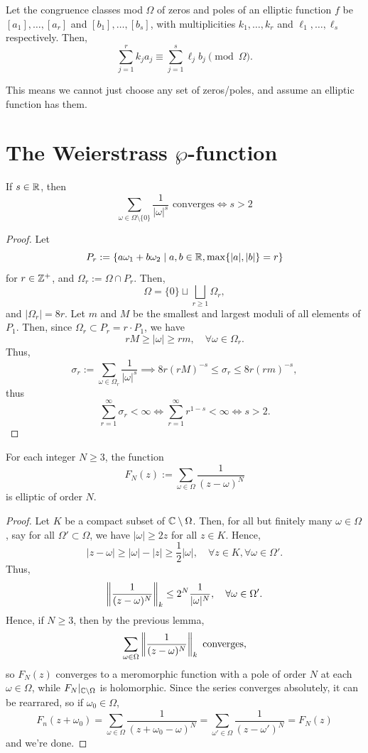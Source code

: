 \documentclass[11pt]{article}
\begin{document}
\begin{thm}
    Let the congruence classes mod $\Omega$ of zeros and poles of an elliptic function $f$ be $[a_1],\dots,[a_r]$ and $[b_1],\dots,[b_s]$, with multiplicities $k_1,\dots,k_r$ and $\ell_1,\dots,\ell_s$ respectively. Then,
    $$\sum_{j=1}^rk_ja_j \equiv \sum_{j=1}^s \ell_jb_j \pmod \Omega.$$
\end{thm}
This means we cannot just choose any set of zeros/poles, and assume an elliptic function has them.

\section{\texorpdfstring{The Weierstrass $\wp$-function}{The Weierstrass p-function}}

\begin{lem}
    If $s \in \mathbb{R}$, then
    $$\sum_{\omega \in \Omega\setminus\{0\}}\frac{1}{|\omega|^s} \text{ converges} \iff s>2$$
\end{lem}

\begin{proof}
    Let 
    $$P_r:=\{a\omega_1+b\omega_2 \mid a,b\in \mathbb{R}, \max \{|a|,|b|\} =r\}$$ 
    for $r \in \mathbb{Z}^+$, and $\Omega_r:= \Omega \cap P_r$. Then,
    $$\Omega =\{0\} \sqcup \bigsqcup_{r \geq 1}\Omega_r,$$
    and $|\Omega_r| = 8r$. Let $m$ and $M$ be the smallest and largest moduli of all elements of $P_1$. Then, since $\Omega_r \subset P_r = r\cdot P_1$, we have
    $$rM \ge |\omega| \geq rm, \quad \forall \omega \in \Omega_r.$$
    Thus,
    $$\sigma _r := \sum_{\omega \in \Omega_r}\frac{1}{|\omega|^s}\implies 8r(rM)^{-s}\leq \sigma_r \leq 8r(rm)^{-s},$$
    thus
    $$\sum_{r=1}^\infty \sigma_r < \infty \iff \sum_{r=1}^\infty r^{1-s}<\infty \iff s>2.$$
\end{proof}

\begin{cor}
    For each integer $N \geq 3$, the function 
    $$F_N(z):= \sum_{\omega \in \Omega}\frac{1}{(z-\omega)^N}$$
    is elliptic of order $N$.
\end{cor}

\begin{proof}
    Let $K$ be a compact subset of $\mathbb{C} \setminus \Omega$. Then, for all but finitely many $\omega \in \Omega$, say for all $\Omega'\subset \Omega$, we have $|\omega| \geq 2z$ for all $z \in K$. Hence,
    $$|z-\omega| \geq |\omega| - |z| \geq \frac{1}{2}|\omega|, \quad \forall z \in K,\forall \omega \in \Omega'.$$
    Thus,
    $$\left\lVert \frac{1}{(z-\omega)^N} \right\rVert_k \leq 2^N \frac{1}{|\omega|^N}, \quad \forall \omega \in \Omega'.$$
    Hence, if $N \geq 3$, then by the previous lemma,
    $$\sum_{\omega \in \Omega}\left\lVert \frac{1}{(z-\omega)^N} \right\rVert_k \text{ converges,}$$
    so $F_N(z)$ converges to a meromorphic function with a pole of order $N$ at each $\omega \in \Omega$, while $F_N|_{\mathbb{C}\setminus \Omega}$ is holomorphic. Since the series converges absolutely, it can be rearrared, so if $\omega_0 \in \Omega$,
    $$F_n(z+\omega_0) = \sum_{\omega \in \Omega}\frac{1}{(z+\omega_0-\omega)^N}=\sum_{\omega' \in \Omega}\frac{1}{(z-\omega')^N}=F_N(z)$$
    and we're done.
\end{proof}
\end{document}
